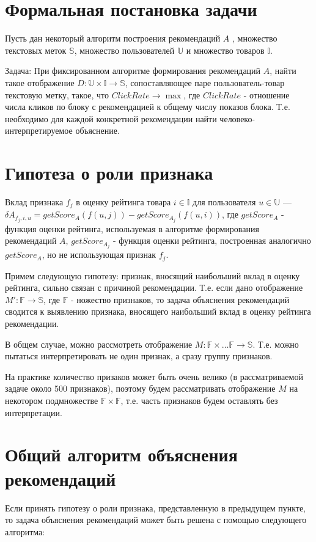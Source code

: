 \documentclass[12pt,a4paper]{report}
\begin{document}
\section{Формальная постановка задачи}
Пусть дан некоторый алгоритм построения рекомендаций $A$ ,  множество текстовых меток $\mathbb{S}$, множество пользователей $\mathbb{U}$ и множество товаров $\mathbb{I}$.

Задача: При фиксированном алгоритме формирования рекомендаций $A$, найти такое отображение $D: \mathbb{U} \times \mathbb{I} \to \mathbb{S}$, сопоставляющее паре пользователь-товар  текстовую метку, такое, что  $ClickRate \to \max$, где $ClickRate$ - отношение числа кликов по блоку с рекомендацией к общему числу показов блока. Т.е. необходимо для каждой конкретной рекомендации найти человеко-интерпретируемое объяснение. 

\section{Гипотеза о роли признака}
\begin{Def}
Вклад признака $f_j$ в оценку рейтинга товара $i \in \mathbb{I}$ для пользователя $u \in \mathbb{U}$ --- $\delta A_{f_j,i,u} = getScore_A(f(u, j)) - getScore_{A_j}(f(u, i))$, где $getScore_A$ - функция оценки рейтинга, используемая в алгоритме формирования рекомендаций $A$, $getScore_{A_j}$ - функция оценки рейтинга, построенная аналогично $getScore_{A}$, но не использующая признак $f_j$.
\end{Def}
Примем следующую гипотезу: признак, вносящий наибольший вклад в оценку рейтинга, сильно связан с причиной рекомендации.
Т.е. если дано отображение $M': \mathbb{F} \to \mathbb{S}$, где $\mathbb{F}$ - ножество признаков, то задача объяснения рекомендаций сводится к выявлению признака, вносящего наибольший вклад в оценку рейтинга рекомендации.

В общем случае, можно рассмотреть отображение $M: \mathbb{F} \times \dots \mathbb{F} \to \mathbb{S}$. Т.е. можно пытаться интерпретировать не один признак, а сразу группу признаков.

На практике количество призаков может быть очень велико (в рассматриваемой задаче около 500 признаков), поэтому будем рассматривать отображение $M$ на некотором подмножестве $\mathbb{F} \times \mathbb{F}$, т.е. часть признаков будем оставлять без интерпретации.

\section{Общий алгоритм объяснения рекомендаций}
Если принять гипотезу о роли признака, представленную в предыдущем пункте, то задача объяснения рекомендаций может быть решена с помощью следующего алгоритма:
\end{document}
